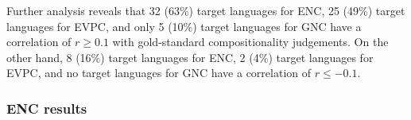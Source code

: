 \documentclass[output=paper,modfonts,nonflat]{langsci/langscibook}
\begin{document}



Further analysis reveals that 32 (63\%) target languages for ENC, 25
(49\%) target languages for EVPC, and only 5 (10\%) target languages for
GNC have a correlation of $r \ge 0.1$ with gold-standard
compositionality judgements. On the other hand, 8 (16\%) target
languages for ENC, 2 (4\%) target languages for EVPC, and no target
languages for GNC have a correlation of $r \le -0.1$.

\subsubsection{ENC results}
\end{document}
